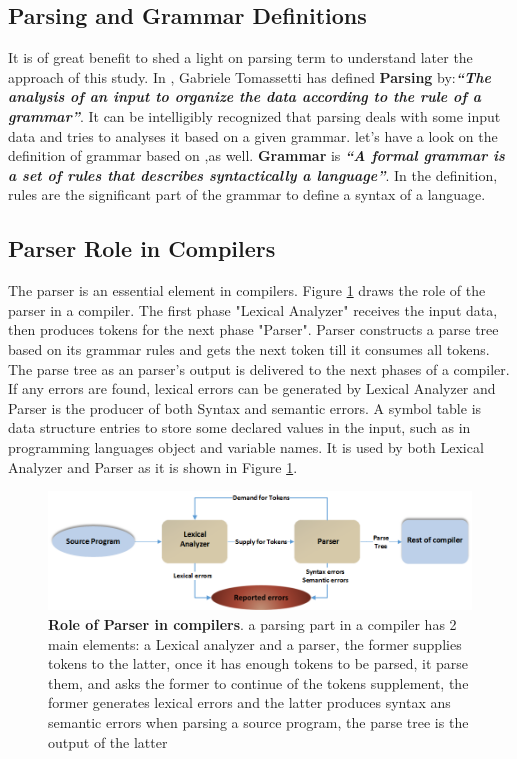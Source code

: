 \subsection{Parsing and Grammar Definitions}
It is of great benefit to shed a light on parsing term to understand later the approach of this study. In \cite{parsingGuide2017}, Gabriele Tomassetti has defined \textbf{Parsing} by:{\it  \textbf{``The analysis of an input to organize the data according to the rule of a grammar''}}. It can be intelligibly recognized that parsing deals with some input data and tries to analyses it based on a given grammar. let's have a look on the definition of grammar based on  \cite{parsingGuide2017},as well. \textbf{Grammar} is 
{\it \textbf{``A formal grammar is a set of rules that describes syntactically a language''}}. In the definition, rules are the significant part of the grammar to define a syntax of a language.  
\subsection{Parser Role in Compilers}
The parser is an essential element in  compilers. {Figure \ref{Fig:parserPosition}} draws the role of the parser in a compiler. The first phase "Lexical Analyzer" receives the input data, then produces tokens for the next phase "Parser". Parser constructs a parse tree based on its grammar rules and gets the next token till it consumes all tokens. The parse tree as an parser's output is delivered to the next phases of a compiler. If any errors are found, lexical errors can be generated by Lexical Analyzer and Parser is the producer of both Syntax and semantic errors.%
 A symbol table is data structure entries to store some declared values in the input, such as in programming languages object and variable names. It is used by both  Lexical Analyzer and Parser as it is shown in {Figure \ref{Fig:parserPosition}}.

\begin{figure}[ht]
	\begin{center}
		\setlength\belowcaptionskip{-7mm}
		\includegraphics[scale=0.55,angle=0]{images/ParserRole}
		\caption{\textbf{Role of Parser in compilers}. a parsing part in a compiler has 2 main elements: a Lexical analyzer and a parser, the former supplies tokens to the latter, once it has enough tokens to be parsed, it parse them, and asks the former to continue of the tokens supplement, the former generates lexical errors and the latter produces syntax ans semantic errors when parsing a source program, the parse tree is the output of the latter }
		\label{Fig:parserPosition}
	\end{center}
\end{figure}
